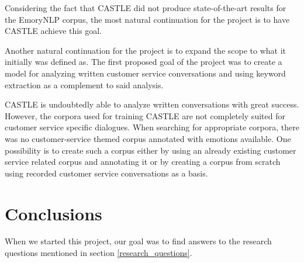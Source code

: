 \documentclass[nofilelist]{cslthse-msc}
\begin{document}
Considering the fact that CASTLE did not produce state-of-the-art results for the EmoryNLP corpus, the most natural continuation for the project is to have CASTLE achieve this goal.  


Another natural continuation for the project is to expand the scope to what it initially was defined as. The first proposed goal of the project was to create a model for analyzing written customer service conversations and using keyword extraction as a complement to said analysis. 

CASTLE is undoubtedly able to analyze written conversations with great success. However, the corpora used for training CASTLE are not completely suited for customer service specific dialogues. When searching for appropriate corpora, there was no customer-service themed corpus annotated with emotions available. One possibility is to create such a corpus either by using an already existing customer service related corpus and annotating it or by creating a corpus from scratch using recorded customer service conversations as a basis. 








\chapter{Conclusions}
When we started this project, our goal was to find answers to the research questions mentioned in section \ref{research_questions}.



{}
\end{document}
